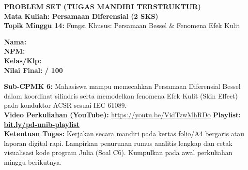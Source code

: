 \documentclass[10pt,a4paper]{article}
\begin{document}
\noindent\begin{minipage}[c]{0.68\textwidth}%
  {\large\textbf{\color{unibblue}PROBLEM SET (TUGAS MANDIRI TERSTRUKTUR)}}\\[1mm]
  {\normalsize\textbf{Mata Kuliah: Persamaan Diferensial (2 SKS)}}\\[0.5mm]
  {\small\textbf{Topik Minggu 14:} Fungsi Khusus: Persamaan Bessel \& Fenomena Efek Kulit}%
\end{minipage}%
\hfill%
\begin{minipage}[c]{0.30\textwidth}%
  \begin{tcolorbox}[colback=unibblue!5,colframe=unibblue,boxrule=0.6pt,arc=2pt,left=4pt,right=4pt,top=2pt,bottom=2pt]
    \scriptsize
    \textbf{Nama:} \dotfill\\[1.2mm]
    \textbf{NPM:} \dotfill\\[1.2mm]
    \textbf{Kelas/Klp:} \dotfill\\[1.2mm]
    \textbf{Nilai Final:} \hfill \textbf{/ 100}
  \end{tcolorbox}%
\end{minipage}\par

\vspace{1.5mm}

\begin{tcolorbox}[colback=boxbg,colframe=unibgold!90!black,boxrule=0.6pt,arc=2pt,left=5pt,right=5pt,top=3pt,bottom=3pt,title=\textbf{\scriptsize Capaian Pembelajaran (Sub-CPMK 6) \& Pedoman Pengerjaan Tugas}]
  \scriptsize
  \textbf{Sub-CPMK 6:} Mahasiswa mampu memecahkan Persamaan Diferensial Bessel dalam koordinat silindris serta memodelkan fenomena Efek Kulit (Skin Effect) pada konduktor ACSR sesuai IEC 61089.\\
  \textbf{Video Perkuliahan (YouTube):} \url{https://youtu.be/VidTzwMhRDo} \hfill \textbf{Playlist:} \href{https://www.youtube.com/playlist?list=PLS5oOZWXZeTw}{\color{unibblue}\textbf{bit.ly/pd-unib-playlist}}\\\textbf{Ketentuan Tugas:} Kerjakan secara mandiri pada kertas folio/A4 bergaris atau laporan digital rapi. Lampirkan penurunan rumus analitis lengkap dan cetak visualisasi kode program Julia (Soal C6). Kumpulkan pada awal perkuliahan minggu berikutnya.
\end{tcolorbox}

\vspace{1.5mm}
\end{document}
